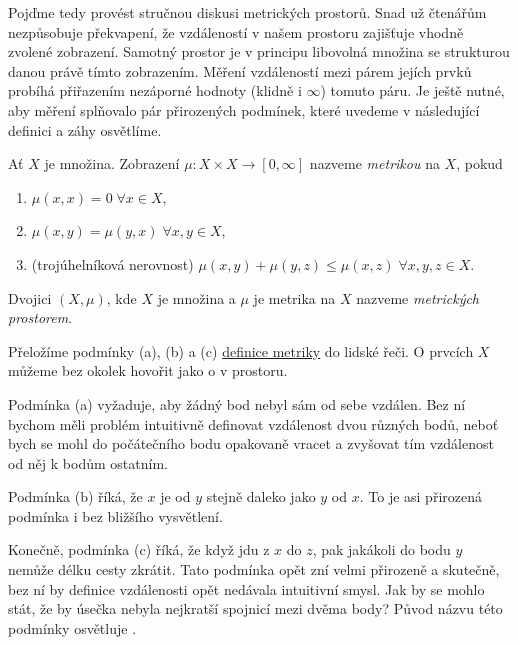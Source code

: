 Pojďme tedy provést stručnou diskusi metrických prostorů. Snad už čtenářům
nezpůsobuje překvapení, že  vzdáleností v našem prostoru zajišťuje
vhodně zvolené zobrazení. Samotný prostor je v principu libovolná množina se
strukturou danou právě tímto zobrazením. Měření vzdáleností mezi párem jejích
prvků probíhá přiřazením nezáporné hodnoty (klidně i $\infty$) tomuto páru. Je
ještě nutné, aby měření splňovalo pár přirozených podmínek, které uvedeme v
následující definici a záhy osvětlíme.

\begin{definition}[Metrika]
 \label{def:metrika}
 Ať $X$ je množina. Zobrazení $\mu: X \times X \to [0,\infty]$ nazveme
 \emph{metrikou} na $X$, pokud
 \begin{enumerate}[label=(\alph*)]
  \item $\mu(x,x) = 0 \; \forall x \in X$,
  \item $\mu(x,y) = \mu(y,x) \; \forall x,y \in X$,
  \item (trojúhelníková nerovnost) $\mu(x,y) + \mu(y,z) \leq \mu(x,z) \;
   \forall x,y,z \in X$.
 \end{enumerate}
\end{definition}

\begin{definition}
 \label{def:metricky-prostor}
 Dvojici $(X,\mu)$, kde $X$ je množina a $\mu$ je metrika na $X$ nazveme
 \emph{metrických prostorem}.
\end{definition}

\begin{remark}
 Přeložíme podmínky (a), (b) a (c) \hyperref[def:metrika]{definice metriky} do
 lidské řeči. O prvcích $X$ můžeme bez okolek hovořit jako o  v
 prostoru.

 Podmínka (a) vyžaduje, aby žádný bod nebyl sám od sebe vzdálen. Bez ní bychom
 měli problém intuitivně definovat vzdálenost dvou různých bodů, neboť bych se
 mohl do počátečního bodu opakovaně vracet a zvyšovat tím vzdálenost od něj k
 bodům ostatním.

 Podmínka (b) říká, že $x$ je od $y$ stejně daleko jako $y$ od $x$. To je asi
 přirozená podmínka i bez bližšího vysvětlení.

 Konečně, podmínka (c) říká, že když jdu z $x$ do $z$, pak jakákoli
  do bodu $y$ nemůže délku cesty zkrátit. Tato podmínka opět zní
 velmi přirozeně a skutečně, bez ní by definice vzdálenosti opět nedávala
 intuitivní smysl. Jak by se mohlo stát, že by úsečka nebyla nejkratší spojnicí
 mezi dvěma body? Původ názvu  této podmínky
 osvětluje .
\end{remark}

